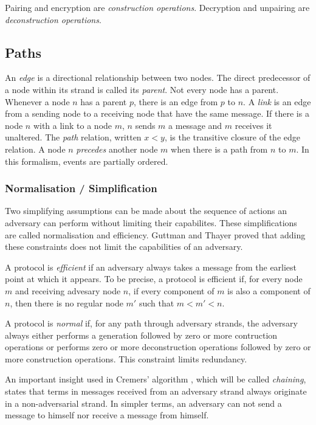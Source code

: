 			Pairing and encryption are \emph{construction operations}.
			Decryption and unpairing are \emph{deconstruction operations}.

		\subsection{Paths}

			An \emph{edge} is a directional relationship between two nodes.
			The direct predecessor of a node within its strand is called its
			\emph{parent}. Not every node has a parent. Whenever a node $n$ has
			a parent $p$, there is an edge from $p$ to $n$. A \emph{link} is an
			edge from a sending node to a receiving node that have the same
			message. If there is a node $n$ with a link to a node $m$, $n$
			sends $m$ a message and $m$ receives it unaltered. The \emph{path}
			relation, written $x < y$, is the transitive closure of the edge
			relation. A node $n$ \emph{precedes} another node $m$ when there is
			a path from $n$ to $m$. In this formalism, events are partially
			ordered.

		\subsubsection{Normalisation / Simplification}

			Two simplifying assumptions can be made about the sequence of
			actions an adversary can perform without limiting their
			capabilites. These simplifications are called normalisation and
			efficiency. Guttman and Thayer \cite{GJF02} proved that adding
			these constraints does not limit the capabilities of an adversary.

			A protocol is \emph{efficient} if an adversary always takes a
			message from the earliest point at which it appears. To be precise,
			a protocol is efficient if, for every node $m$ and receiving
			advesary node $n$, if every component of $m$ is also a component of
			$n$, then there is no regular node $m'$ such that $m < m' < n$.

			A protocol is \emph{normal} if, for any path through adversary
			strands, the adversary always either performs a generation followed
			by zero or more contruction operations or performs zero or more
			deconstruction operations followed by zero or more construction
			operations. This constraint limits redundancy.

			An important insight used in Cremers' algorithm \cite{Cremers08},
			which will be called \emph{chaining}, states that terms in messages
			received from an adversary strand always originate in a
			non-adversarial strand. In simpler terms, an adversary can not send
			a message to himself nor receive a message from himself.

